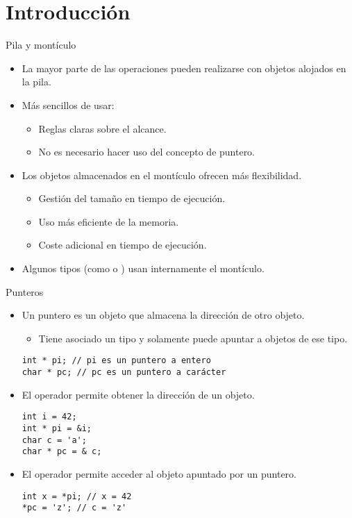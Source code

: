 \section{Introducción}

\begin{frame}{Pila y montículo}
\begin{itemize}
  \item La mayor parte de las operaciones pueden realizarse con objetos alojados en la pila.
  \item Más sencillos de usar:
    \begin{itemize}
      \item Reglas claras sobre el alcance.
      \item No es necesario hacer uso del concepto de puntero.
    \end{itemize}
  \item Los objetos almacenados en el montículo ofrecen más flexibilidad.
    \begin{itemize}
      \item Gestión del tamaño en tiempo de ejecución.
      \item Uso más eficiente de la memoria.
      \item Coste adicional en tiempo de ejecución.
    \end{itemize}
  \item Algunos tipos (como  o ) usan internamente el montículo.
\end{itemize}
\end{frame}

\begin{frame}[fragile]{Punteros}
\begin{itemize}
  \item Un \alert{puntero} es un objeto que almacena la dirección de otro objeto.
    \begin{itemize}
      \item Tiene asociado un tipo y solamente puede apuntar a objetos de ese tipo.
    \end{itemize}
\begin{lstlisting}
int * pi; // pi es un puntero a entero
char * pc; // pc es un puntero a carácter
\end{lstlisting}
  \item El operador \cppkey{\&} permite obtener la dirección de un objeto.
\begin{lstlisting}
int i = 42;
int * pi = &i;
char c = 'a';
char * pc = & c;
\end{lstlisting}
  \item El operador \cppkey{*} permite acceder al objeto apuntado por un puntero.
\begin{lstlisting}
int x = *pi; // x = 42
*pc = 'z'; // c = 'z'
\end{lstlisting}
\end{itemize}
\end{frame}
